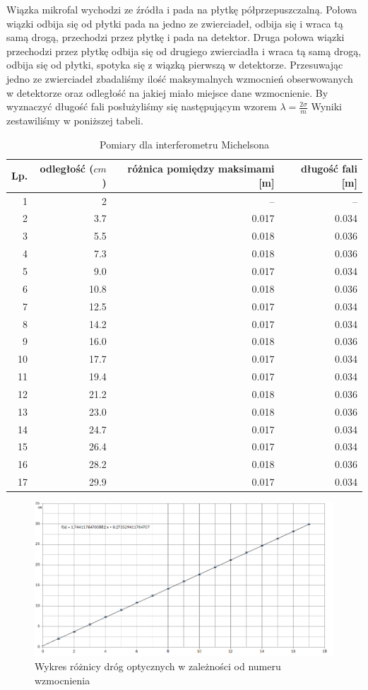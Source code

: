 \documentclass[a4paper]{article}
\begin{document}
 Wiązka mikrofal wychodzi ze źródła i pada na płytkę półprzepuszczalną. Połowa  wiązki odbija się od płytki pada na jedno ze zwierciadeł, odbija się i wraca tą samą drogą, przechodzi przez płytkę i pada na detektor.  Druga połowa wiązki przechodzi przez płytkę odbija się od drugiego zwierciadła i wraca tą samą drogą, odbija się od płytki, spotyka się z wiązką pierwszą w detektorze. Przesuwając jedno ze zwierciadeł zbadaliśmy ilość maksymalnych wzmocnień obserwowanych w detektorze oraz odległość na jakiej miało miejsce dane wzmocnienie.
By wyznaczyć długość fali posłużyliśmy się następującym wzorem $\lambda = \frac{2 \sigma}{m}$
 Wyniki zestawiliśmy w poniższej tabeli. 
\newpage
\begin{table}[h!]
\centering
\begin{tabular}{rrrr}
\toprule
Lp. &  odległość ($cm$) & różnica pomiędzy maksimami [m] & długość fali [m]\\
\midrule
1 & 2 & -- & -- \\
2 & 3.7 & 0.017 & 0.034\\
3 & 5.5 & 0.018 & 0.036\\
4 & 7.3 & 0.018 & 0.036\\
5 & 9.0 & 0.017 & 0.034\\
6 & 10.8 & 0.018 & 0.036\\
7 & 12.5 & 0.017 & 0.034\\
8 & 14.2 & 0.017 & 0.034\\
9 & 16.0 & 0.018 & 0.036\\
10 & 17.7 & 0.017 & 0.034\\
11 & 19.4 & 0.017 & 0.034\\
12 & 21.2 & 0.018 & 0.036\\
13 & 23.0 & 0.018 & 0.036\\
14 & 24.7 & 0.017 & 0.034\\
15 & 26.4 & 0.017 & 0.034\\
16 & 28.2 & 0.018 & 0.036\\
17 & 29.9 & 0.017 & 0.034\\
\bottomrule
\end{tabular}
\caption{Pomiary dla interferometru Michelsona}
\label{pomiary_michelson}
\end{table}

\begin{figure}[h!]
\centering
\includegraphics[scale=0.6]{michelson_micro.png}
\caption{Wykres różnicy dróg optycznych w zależności od numeru wzmocnienia}
\label{michelson}
\end{figure}
\end{document}
